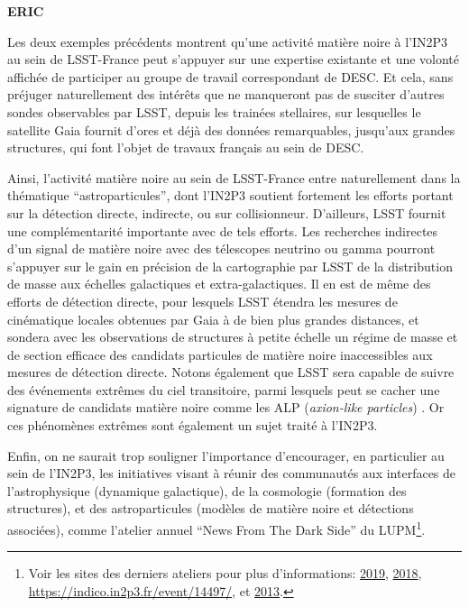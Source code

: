 \documentclass[12pt]{article}
\begin{document}

{\bf ERIC}


Les deux exemples précédents montrent qu'une activité matière noire à l'IN2P3 au sein de LSST-France peut s'appuyer sur une expertise existante et une volonté affichée de participer au groupe de travail correspondant de DESC. Et cela, sans préjuger naturellement des intérêts que ne manqueront pas de susciter d'autres sondes observables par LSST, depuis les trainées stellaires, sur lesquelles le satellite Gaia fournit d'ores et déjà des données remarquables, jusqu'aux grandes structures, qui font l'objet de travaux français au sein de DESC.

Ainsi, l'activité matière noire au sein de LSST-France entre naturellement dans la thématique ``astroparticules'', dont l'IN2P3 soutient fortement les efforts portant sur la détection directe, indirecte, ou sur collisionneur. D'ailleurs, LSST fournit une complémentarité importante avec de tels efforts. Les recherches indirectes d'un signal de matière noire avec des télescopes neutrino ou gamma \citep{Charles:2016,Albert:2017,1404.5503} pourront s'appuyer sur le gain en précision de la cartographie par LSST de la distribution de masse aux échelles galactiques et extra-galactiques.
Il en est de même des efforts de détection directe, pour lesquels LSST étendra les mesures de cinématique locales obtenues par Gaia à de bien plus grandes distances, et sondera avec les observations de structures à petite échelle un régime de masse et de section efficace des candidats particules de matière noire inaccessibles aux mesures de détection directe.
Notons également que LSST sera capable de suivre des événements extrêmes du ciel transitoire, parmi lesquels peut se cacher une signature de candidats matière noire comme les ALP ({\it axion-like particles}) \citep{2017PhRvL.118a1103M}. Or ces phénomènes extrêmes sont également un sujet traité à l'IN2P3.

Enfin, on ne saurait trop souligner l'importance d'encourager, en particulier au sein de l'IN2P3, les initiatives visant à réunir des communautés aux interfaces de l'astrophysique (dynamique galactique), de la cosmologie (formation des structures), et des astroparticules (modèles de matière noire et détections associées), comme l'atelier annuel ``News From The Dark Side'' du LUPM\footnote{Voir les sites des derniers ateliers pour plus d'informations: \href{https://indico.in2p3.fr/event/19035/}{2019}, \href{https://indico.in2p3.fr/event/17224/}{2018}, \href{https://indico.in2p3.fr/event/14497/}{https://indico.in2p3.fr/event/14497/}, et \href{https://indico.in2p3.fr/event/9143/}{2013}.}. 
\end{document}
